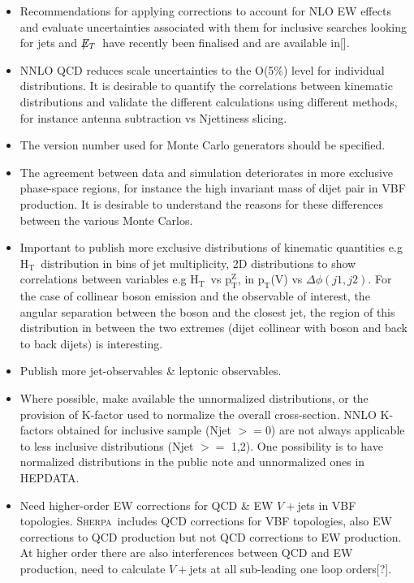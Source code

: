 \documentclass[a4paper,11pt,notoc]{article}
\newcommand{\pt}{\ensuremath{\mathrm{p_T}}}
\newcommand{\ptZ}{\ensuremath{\mathrm{p_T^{Z}}}}
\newcommand{\Ht}{\ensuremath{\mathrm{H_T}}}
\newcommand{\met}{\ensuremath{\not\!\!E_T}}
\newcommand{\SHERPA}{\textsc{Sherpa}}
\begin{document}
\begin{itemize}
\item Recommendations for applying corrections to account for NLO EW effects and evaluate uncertainties associated with them for inclusive searches looking for jets and \met\ have recently been finalised and are available in[].
\item NNLO QCD reduces scale uncertainties to the O(5\%) level for individual distributions. It is desirable to quantify the correlations between kinematic distributions and validate the different calculations using different methods, for instance antenna subtraction vs Njettiness slicing.
\item The version number used for Monte Carlo generators should be specified.
\item The agreement between data and simulation deteriorates in more exclusive phase-space regions, for instance the high invariant mass of dijet pair in VBF production. It is desirable to understand the reasons for these differences between the various Monte Carlos.
\item Important to publish more exclusive distributions of kinematic quantities e.g \Ht\ distribution in bins of jet multiplicity, 2D distributions to show correlations between variables e.g \Ht\ vs \ptZ, in \pt(V) vs $\Delta\phi(j1,j2)$. For the case of collinear boson emission and the observable of interest, the angular separation between the boson and the closest jet, the region of this distribution in between the two extremes (dijet collinear with boson and back to back dijets) is interesting. 
\item Publish more jet-observables \& leptonic observables.
\item Where possible, make available the unnormalized distributions, or the provision of K-factor used to normalize the overall cross-section. NNLO K-factors obtained for inclusive sample (Njet $>=$0) are not always applicable to less inclusive distributions (Njet $>=$ 1,2). One possibility is to have normalized distributions in the public note and unnormalized ones in HEPDATA.
\item Need higher-order EW corrections for QCD \& EW $V+$jets in VBF topologies. \SHERPA\ includes QCD corrections for VBF topologies, also EW corrections to QCD production but not QCD corrections to EW production. At higher order there are also interferences between QCD and EW production, need to calculate $V+$jets at all sub-leading one loop orders[?].  
\end{itemize}



\end{document}
